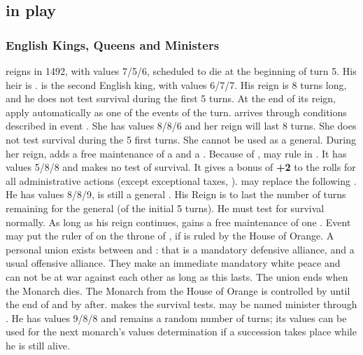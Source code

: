\subsection{ in play}
\subsubsection{English Kings, Queens and Ministers}
 reigns in 1492, with values 7/5/6,
scheduled to die at the beginning of turn 5. His heir is .
 is the second English king, with
values 6/7/7. His reign is 8 turns long, and he does not test survival
during the first 5 turns. At the end of its reign, apply automatically
 as one of the events of the turn.
 arrives through conditions
described in event . She has values 8/8/6
and her reign will last 8 turns. She does not test survival during the 5
first turns. She cannot be used as a general. During her reign, \ENG
adds a free maintenance of a \FLEET\faceplus and a \corsaire\faceplus.
 Because of
,  may rule in
\ENG. It has values 5/8/8 and makes no test of survival. It gives a
bonus of {\bf +2} to the rolls for all administrative actions (except
exceptional taxes, ).
 may replace the 
following . He has values 8/8/9, is
still a general .  His Reign is to last the number
of turns remaining for the general (of the initial 5 turns).  He must
test for survival normally. As long as his reign continues, \ENG gains a
free maintenance of one \ARMY\faceplus.
 Event
 may put the ruler of \HOL on the
throne of \ENG, if \HOL is ruled by the House of Orange.
\bparag A personal union exists between \HOL and \ENG: that is a
mandatory defensive alliance, and a usual offensive alliance. They make
an immediate mandatory white peace and can not be at war against each
other as long as this lasts. The union ends when the Monarch dies.
\bparag The Monarch from the House of Orange is controlled by \ANG until
the end of  and by \HOL after. \HOL
makes the survival tests.
 may be named minister through
. He has values 9/8/8 and remains a random
number of turns; its values can be used for the next monarch's values
determination if a succession takes place while he is still alive.

